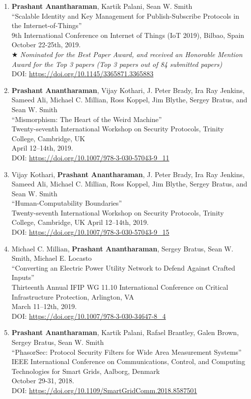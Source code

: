 \documentclass[letterpaper,10pt]{article}
\begin{document}
\begin{enumerate}[label={C\arabic*.}]
\item {\bf Prashant Anantharaman}, Kartik Palani, Sean W. Smith \\
  ``Scalable Identity and Key Management for Publish-Subscribe Protocols in the Internet-of-Things'' \\
  9th International Conference on Internet of Things (IoT 2019), Bilbao, Spain\\
  October 22-25th, 2019.\\
  $\bigstar$ \textit{Nominated for the Best Paper Award, and received an Honorable Mention Award for the Top 3 papers (Top 3 papers out of 84 submitted papers)}\\
  DOI: \url{https://doi.org/10.1145/3365871.3365883}
\item {\bf Prashant Anantharaman}, Vijay Kothari, J. Peter Brady, Ira Ray Jenkins, Sameed Ali, Michael C. Millian, Ross Koppel, Jim Blythe, Sergey Bratus, and Sean W. Smith\\
  ``Mismorphism: The Heart of the Weird Machine''\\
  Twenty-seventh International Workshop on Security Protocols, Trinity College, Cambridge, UK\\
  April 12--14th, 2019.\\
  DOI: \url{https://doi.org/10.1007/978-3-030-57043-9\_11}
\item Vijay Kothari, {\bf Prashant Anantharaman}, J. Peter Brady, Ira Ray Jenkins, Sameed Ali, Michael C. Millian, Ross Koppel, Jim Blythe, Sergey Bratus, and Sean W. Smith\\
  ``Human-Computability Boundaries''\\
  Twenty-seventh International Workshop on Security Protocols, Trinity College, Cambridge, UK
  April 12--14th, 2019.\\
  DOI: \url{https://doi.org/10.1007/978-3-030-57043-9\_15}
\item Michael C. Millian, {\bf Prashant Anantharaman}, Sergey Bratus, Sean W. Smith, Michael E. Locasto\\
  ``Converting an Electric Power Utility Network to Defend Against Crafted Inputs''\\
  Thirteenth Annual IFIP WG 11.10 International Conference on Critical Infrastructure Protection, Arlington, VA\\
  March 11--12th, 2019.\\
  DOI: \url{https://doi.org/10.1007/978-3-030-34647-8\_4}

\item {\bf Prashant Anantharaman}, Kartik Palani, Rafael Brantley, Galen Brown, Sergey Bratus, Sean W. Smith\\
  ``PhasorSec: Protocol Security Filters for Wide Area Measurement Systems''\\
  IEEE International Conference on Communications, Control, and Computing Technologies for Smart Grids, Aalborg, Denmark\\
  October 29-31, 2018.\\
  DOI: \url{https://doi.org/10.1109/SmartGridComm.2018.8587501}


\end{enumerate}
\end{document}
